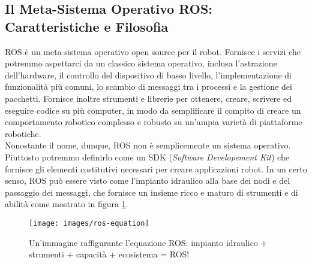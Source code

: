 \subsection{Il Meta-Sistema Operativo ROS: Caratteristiche e Filosofia}
ROS è un meta-sistema operativo open source per il robot. Fornisce i servizi che potremmo aspettarci da un classico sistema operativo, inclusa l'astrazione dell'hardware, il controllo del dispositivo di basso livello, l'implementazione di funzionalità più comuni, lo scambio di messaggi tra i processi e la gestione dei pacchetti. Fornisce inoltre strumenti e librerie per ottenere, creare, scrivere ed eseguire codice su più computer, in modo da semplificare il compito di creare un comportamento robotico complesso e robusto su un'ampia varietà di piattaforme robotiche. \\Nonostante il nome, dunque, ROS non è semplicemente un sistema operativo. Piuttosto potremmo definirlo come un SDK (\textit{Software Developement Kit}) che fornisce gli elementi costitutivi necessari per creare applicazioni robot. In un certo senso, ROS può essere visto come l'impianto idraulico alla base dei nodi e del passaggio dei messaggi, che fornisce un insieme ricco e maturo di strumenti e di abilità come mostrato in figura \ref{fig:bytepost}.
\begin{figure}[h]
	\centering
	\texttt{[image: images/ros-equation]}
	\caption{Un'immagine raffigurante l'equazione ROS: impianto idraulico + strumenti + capacità + ecosistema = ROS!}
	\label{fig:bytepost}
\end{figure}


